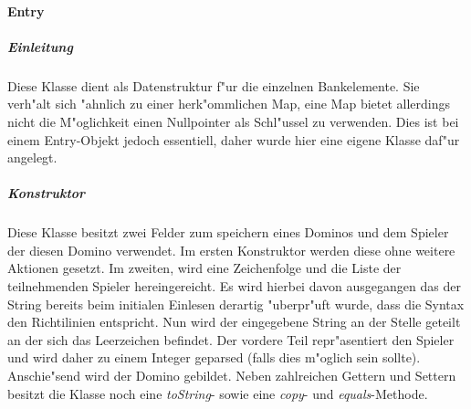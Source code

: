 \paragraph{Entry}
\label{par:entry}


\subparagraph{Einleitung}
Diese Klasse dient als Datenstruktur f"ur die einzelnen Bankelemente. Sie verh"alt sich "ahnlich zu einer herk"ommlichen Map, eine Map bietet allerdings nicht die M"oglichkeit einen Nullpointer als Schl"ussel zu verwenden. Dies ist bei einem Entry-Objekt jedoch essentiell, daher wurde hier eine eigene Klasse daf"ur angelegt. 

\subparagraph{Konstruktor}
Diese Klasse besitzt zwei Felder zum speichern eines Dominos und dem Spieler der diesen Domino verwendet. Im ersten Konstruktor werden diese ohne weitere Aktionen gesetzt. Im zweiten, wird eine Zeichenfolge und die Liste der teilnehmenden Spieler hereingereicht. Es wird hierbei davon ausgegangen das der String bereits beim initialen Einlesen derartig "uberpr"uft wurde, dass die Syntax den Richtilinien entspricht. 
Nun wird der eingegebene String an der Stelle geteilt an der sich das Leerzeichen befindet. Der vordere Teil repr"asentiert den Spieler und wird daher zu einem Integer geparsed (falls dies m"oglich sein sollte). Anschie"send wird der Domino gebildet. Neben zahlreichen Gettern und Settern besitzt die Klasse noch eine \emph{toString}- sowie eine \emph{copy}- und \emph{equals}-Methode. 

